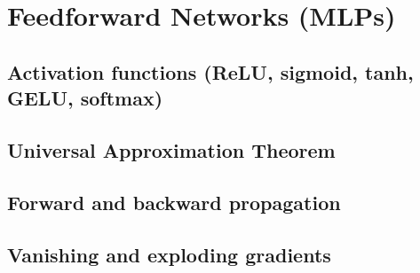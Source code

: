 ﻿\chapter{Feedforward Networks (MLPs)}
\section{Activation functions (ReLU, sigmoid, tanh, GELU, softmax)}

\section{Universal Approximation Theorem}

\section{Forward and backward propagation}

\section{Vanishing and exploding gradients}


